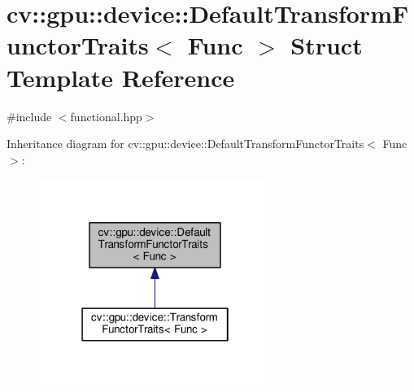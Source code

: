 \hypertarget{structcv_1_1gpu_1_1device_1_1DefaultTransformFunctorTraits}{\section{cv\-:\-:gpu\-:\-:device\-:\-:Default\-Transform\-Functor\-Traits$<$ Func $>$ Struct Template Reference}
\label{structcv_1_1gpu_1_1device_1_1DefaultTransformFunctorTraits}
}


{\ttfamily \#include $<$functional.\-hpp$>$}



Inheritance diagram for cv\-:\-:gpu\-:\-:device\-:\-:Default\-Transform\-Functor\-Traits$<$ Func $>$\-:\nopagebreak
\begin{figure}[H]
\begin{center}
\leavevmode
\includegraphics[width=214pt]{structcv_1_1gpu_1_1device_1_1DefaultTransformFunctorTraits__inherit__graph}
\end{center}
\end{figure}

